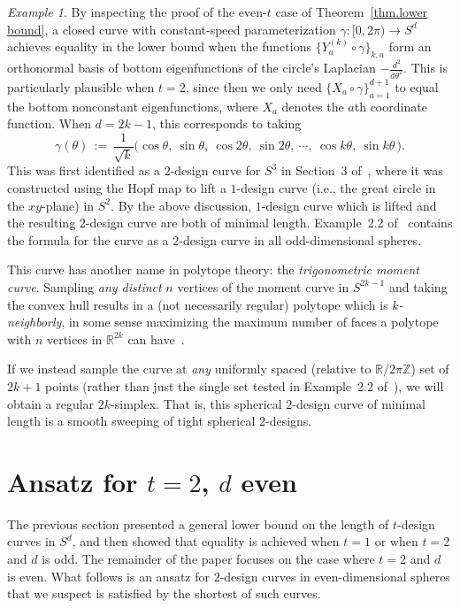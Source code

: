 \documentclass[12pt]{article}
\theoremstyle{plain}
\theoremstyle{definition}
\theoremstyle{remark}
\newtheorem{ex}[thm]{Example}
\newcommand{\bR}{\mathbb{R}}
\newcommand{\bZ}{\mathbb{Z}}
\begin{document}
\begin{ex}
\label{ex.opt for t=2 and d odd}
By inspecting the proof of the even-$t$ case of Theorem~\ref{thm.lower bound}, a closed curve with constant-speed parameterization $\gamma\colon[0,2\pi)\to S^{d}$ achieves equality in the lower bound when the functions $\{Y^{(k)}_a\circ \gamma\}_{k,a}$ form an orthonormal basis of bottom eigenfunctions of the circle's Laplacian $-\frac{d^2}{d\theta^2}$.
This is particularly plausible when $t=2$, since then we only need $\{X_a\circ \gamma\}_{a=1}^{d+1}$ to equal the bottom nonconstant eigenfunctions, where $X_a$ denotes the $a$th coordinate function.
When $d=2k-1$, this corresponds to taking
\[
\gamma(\theta)
\,:=\,\frac{1}{\sqrt{k}}\big(
\cos\theta,
~\sin\theta,
~\cos2\theta,
~\sin2\theta,
~\cdots,
~\cos k\theta,
~\sin k\theta
\,\big).
\]
This was first identified as a $2$-design curve for $S^3$ in Section~3 of~\cite{Lindblad:24}, where it was constructed using the Hopf map to lift a $1$-design curve (i.e., the great circle in the $xy$-plane) in $S^2$.
By the above discussion, $1$-design curve which is lifted and the resulting $2$-design curve are both of minimal length.
Example~2.2 of~\cite{EhlerGK:25} contains the formula for the curve as a $2$-design curve in all odd-dimensional spheres.


This curve has another name in polytope theory: the \emph{trigonometric moment curve}.  
Sampling \emph{any distinct} $n$ vertices of the moment curve in $S^{2k-1}$ and taking the convex hull results in a (not necessarily regular) polytope which is \emph{$k$-neighborly}, in some sense maximizing the maximum number of faces a polytope with $n$ vertices in $\bR^{2k}$ can have~\cite{Caratheodory:11,Gale:63}.

If we instead sample the curve at \emph{any} uniformly spaced (relative to $\bR/2\pi \bZ$) set of $2k+1$ points (rather than just the single set tested in Example~2.2 of~\cite{EhlerGK:25}), we will obtain a regular $2k$-simplex.
That is, this spherical $2$-design curve of minimal length is a smooth sweeping of tight spherical $2$-designs.
\end{ex}




\section{Ansatz for $t=2$, $d$ even}\label{sec:ans}

The previous section presented a general lower bound on the length of $t$-design curves in $S^d$, and then showed that equality is achieved when $t=1$ or when $t=2$ and $d$ is odd.
The remainder of the paper focuses on the case where $t=2$ and $d$ is even. 
What follows is an ansatz for $2$-design curves in even-dimensional spheres that we suspect is satisfied by the shortest of such curves.
\end{document}
